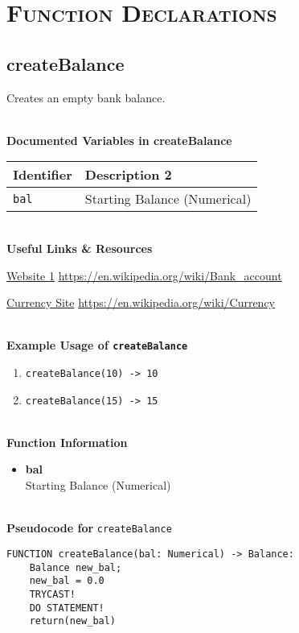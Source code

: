 
\section{\textsc{Function Declarations}}
\clearpage

\subsection{createBalance}
Creates an empty bank balance.

\textbf{ \\ Documented Variables in createBalance}
\begin{table}[htbp]
	\centering
	\begin{tabular}{|l|l|}
		\hline
		Identifier & Description 2 \\
		\hline
		 \texttt{bal} & Starting Balance (Numerical) \\
		\hline
	\end{tabular}
\end{table}

 \textbf{ \\ Useful Links \& Resources}

\href{https://en.wikipedia.org/wiki/Bank_account}{Website 1} \hfill \url{https://en.wikipedia.org/wiki/Bank_account} 

\href{https://en.wikipedia.org/wiki/Currency}{Currency Site} \hfill \url{https://en.wikipedia.org/wiki/Currency} 

\textbf{ \\ Example Usage of \texttt{createBalance}}
\begin{enumerate}
	\setlength{\itemsep}{0pt}
	\setlength{\parskip}{0pt}
	\setlength{\parsep}{0pt}
	\item \verb|createBalance(10) -> 10|
	\item \verb|createBalance(15) -> 15|
\end{enumerate}

\textbf{ \\ Function Information}
\begin{itemize}
	\setlength{\itemsep}{0pt}
	\setlength{\parskip}{0pt}
	\setlength{\parsep}{0pt}
	\item \textbf{bal} \\ Starting Balance (Numerical)
\end{itemize}

\textbf{\\ Pseudocode for } \texttt{createBalance}
\begin{verbatim}
FUNCTION createBalance(bal: Numerical) -> Balance:
	Balance new_bal;
	new_bal = 0.0
	TRYCAST!
	DO STATEMENT!
	return(new_bal)
\end{verbatim}

